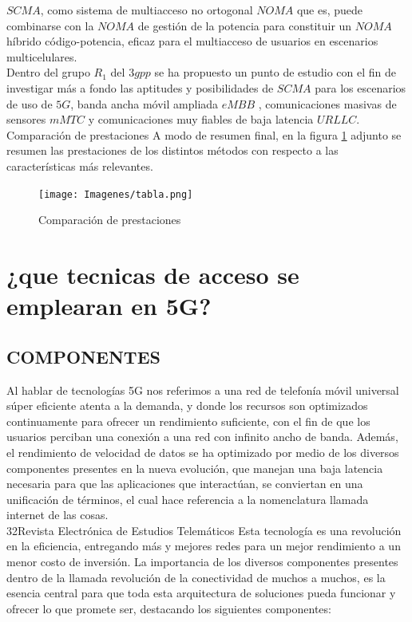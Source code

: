 \documentclass[]{article}
\begin{document}
$SCMA$, como sistema de multiacceso no ortogonal $NOMA$ que es, puede combinarse con la $NOMA$ de gestión de la potencia para constituir un $NOMA$ híbrido código-potencia, eficaz para el multiacceso de usuarios en escenarios multicelulares.\\

Dentro del grupo $R_1$ del $3gpp$ se ha propuesto un punto de estudio con el fin de investigar más a fondo las aptitudes y posibilidades de $SCMA$ para los escenarios de uso de $5G$, banda ancha móvil ampliada $eMBB$ , comunicaciones masivas de sensores $mMTC$ y comunicaciones muy fiables de baja latencia $URLLC$.\\
 
Comparación de prestaciones 
A modo de resumen final, en la figura \ref{fig:tabla} adjunto se resumen las prestaciones de los distintos métodos con respecto a las características más relevantes.\\

\begin{figure}[h!]
	\centering
	\texttt{[image: Imagenes/tabla.png]}
	\caption{Comparación de prestaciones}
	\label{fig:tabla}
\end{figure}



\section{¿que tecnicas de acceso se emplearan en 5G?}

\subsection{COMPONENTES}

Al hablar de tecnologías 5G nos referimos a una red de telefonía móvil universal súper
eficiente atenta a la demanda, y donde los recursos son optimizados continuamente para
ofrecer un rendimiento suficiente, con el fin de que los usuarios perciban una conexión a
una red con infinito ancho de banda. Además, el rendimiento de velocidad de datos se ha
optimizado por medio de los diversos componentes presentes en la nueva evolución, que
manejan una baja latencia necesaria para que las aplicaciones que interactúan, se
conviertan en una unificación de términos, el cual hace referencia a la nomenclatura
llamada internet de las cosas.\\
32Revista Electrónica de
Estudios Telemáticos
Esta tecnología es una revolución en la eficiencia, entregando más y mejores redes
para un mejor rendimiento a un menor costo de inversión. La importancia de los diversos
componentes presentes dentro de la llamada revolución de la conectividad de muchos a
muchos, es la esencia central para que toda esta arquitectura de soluciones pueda
funcionar y ofrecer lo que promete ser, destacando los siguientes componentes:
\end{document}
